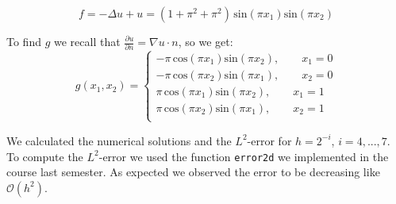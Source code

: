 \documentclass{article}
\begin{document}
\[
	f = -\Delta u + u = (1 + \pi^2 + \pi^2)\,\text{sin}(\pi x_1)\text{sin}(\pi x_2)
\]

To find $g$ we recall that $\frac{\partial u}{\partial n} = \nabla u \cdot n$, so we get:
\[
g(x_1,x_2) = \left\{
	\begin{aligned}
		-\pi\, \text{cos}(\pi x_1)\text{sin}(\pi x_2),\qquad x_1 = 0 \\
		-\pi\, \text{cos}(\pi x_2)\text{sin}(\pi x_1),\qquad x_2 = 0 \\
		\pi\, \text{cos}(\pi x_1)\text{sin}(\pi x_2),\qquad x_1 = 1 \\
		\pi\, \text{cos}(\pi x_2)\text{sin}(\pi x_1),\qquad x_2 = 1 \\
	\end{aligned}
	\right.
\]

We calculated the numerical solutions and the $L^2$-error for $h = 2^{-i}$, $i = 4,...,7$. \\
To compute the $L^2$-error we used the function \texttt{error2d} we implemented in the course last semester. As expected we observed the error to be decreasing like $\mathcal{O}(h^2)$.
\end{document}
